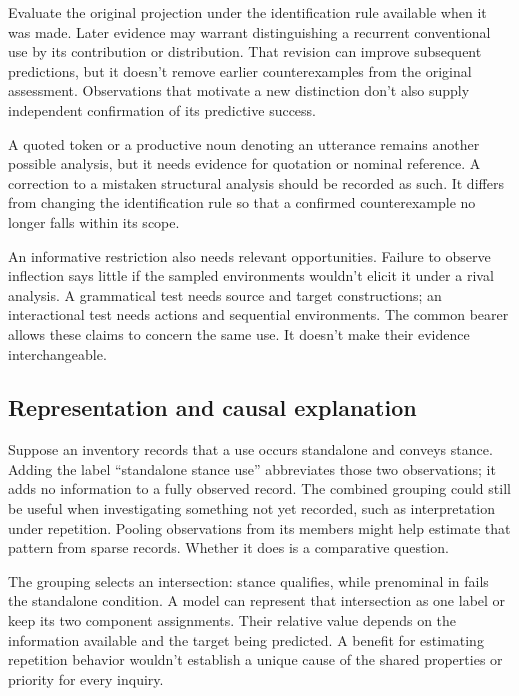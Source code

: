 \documentclass[12pt]{article}
\begin{document}
Evaluate the original projection under the identification rule available
when it was made. Later evidence may warrant distinguishing a recurrent
conventional use by its contribution or distribution. That revision
can improve subsequent predictions, but it doesn't remove earlier
counterexamples from the original assessment. Observations that motivate
a new distinction don't also supply independent confirmation of its
predictive success.

A quoted token or a productive noun denoting an utterance remains
another possible analysis, but it needs evidence for quotation or
nominal reference. A correction to a mistaken structural analysis should
be recorded as such. It differs from changing the identification rule
so that a confirmed counterexample no longer falls within its scope.

An informative restriction also needs relevant opportunities. Failure
to observe inflection says little if the sampled environments wouldn't
elicit it under a rival analysis. A grammatical test needs source and
target constructions; an interactional test needs actions and sequential
environments. The common bearer allows these claims to concern the
same use. It doesn't make their evidence interchangeable.

\subsection{Representation and causal explanation}

Suppose an inventory records that a use occurs standalone and conveys
stance. Adding the label \enquote{standalone stance use} abbreviates
those two observations; it adds no information to a fully observed
record. The combined grouping could still be useful when investigating
something not yet recorded, such as interpretation under repetition.
Pooling observations from its members might help estimate that pattern
from sparse records. Whether it does is a comparative question.

The grouping selects an intersection: stance  qualifies,
while prenominal  in  fails the
standalone condition. A model can represent that intersection as one
label or keep its two component assignments. Their relative value
depends on the information available and the target being predicted.
A benefit for estimating repetition behavior wouldn't establish a
unique cause of the shared properties or priority for every inquiry.
\end{document}
